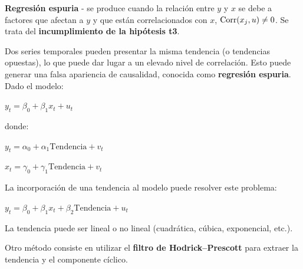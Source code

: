 \begin{f}
	
	\textbf{Regresión espuria} - se produce cuando la relación entre \(y\) y \(x\) se debe a factores que afectan a \(y\) y que están correlacionados con \(x\), \(\mathrm{Corr}(x_{j},u)\neq0\). Se trata del \textbf{incumplimiento de la hipótesis t3}.
	
	Dos series temporales pueden presentar la misma tendencia (o tendencias opuestas), lo que puede dar lugar a un elevado nivel de correlación. Esto puede generar una falsa apariencia de causalidad, conocida como \textbf{regresión espuria}. Dado el modelo:
	
	\begin{center}
		\(y_{t}=\beta_{0}+\beta_{1}x_{t}+u_{t}\)
	\end{center}
	
	donde:
	
	\begin{center}
		\(y_{t}=\alpha_{0}+\alpha_{1}\text{Tendencia}+v_{t}\)
		
		\(x_{t}=\gamma_{0}+\gamma_{1}\text{Tendencia}+v_{t}\)
	\end{center}
	
	La incorporación de una tendencia al modelo puede resolver este problema:
	
	\begin{center}
		\(y_{t}=\beta_{0}+\beta_{1}x_{t}+\beta_{2}\text{Tendencia}+u_{t}\)
	\end{center}
	
	La tendencia puede ser lineal o no lineal (cuadrática, cúbica, exponencial, etc.).
	
	Otro método consiste en utilizar el \textbf{filtro de Hodrick--Prescott} para extraer la tendencia y el componente cíclico.
	
\end{f}

